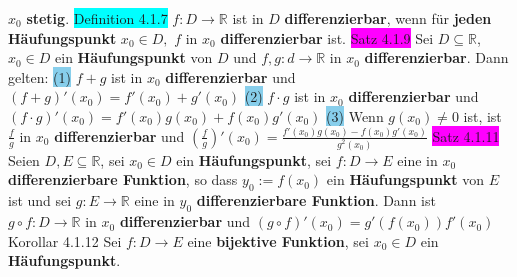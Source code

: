 \documentclass[landscape, 10pt]{article}
\newcommand{\R}{\mathbb{R}}
\begin{document}
\begin{multicols}{3}
                \textcolor{NavyBlue}{$x_0$} 
         \textbf{stetig}.
\colorbox{cyan}{Definition 4.1.7} \textcolor{NavyBlue}{$f:D\longrightarrow\R$} 
                ist in \textcolor{NavyBlue}{$D$} \textbf{differenzierbar}, 
                wenn für \textbf{jeden Häufungspunkt} $x_0\in D,$
                \textcolor{NavyBlue}{$f$} in \textcolor{NavyBlue}{$x_0$} 
         \textbf{differenzierbar} ist.
\colorbox{magenta}{Satz 4.1.9} Sei \textcolor{NavyBlue}{$D\subseteq\R$},\,
                \textcolor{NavyBlue}{$x_0\in D$} 
                ein \textbf{Häufungspunkt} von \textcolor{NavyBlue}{$D$} 
                und \textcolor{NavyBlue}{$f,g:d\longrightarrow\R$} in 
                \textcolor{NavyBlue}{$x_0$} \textbf{differenzierbar}. Dann gelten:
         \colorbox{SkyBlue}{(1)} \textcolor{NavyBlue}{$f+g$}
                 ist in \textcolor{NavyBlue}{$x_0$} \textbf{differenzierbar} und 
                 \textcolor{NavyBlue}{$(f+g)'(x_0)=f'(x_0)+g'(x_0)$} 
         \colorbox{SkyBlue}{(2)} \textcolor{NavyBlue}{$f\cdot g$} 
                ist in \textcolor{NavyBlue}{$x_0$} \textbf{differenzierbar} und 
                \textcolor{NavyBlue}{$(f\cdot g)'(x_0)=f'(x_0)g(x_0)+f(x_0)g'(x_0)$} 
         \colorbox{SkyBlue}{(3)} Wenn \textcolor{NavyBlue}{$g(x_0)\neq0$} ist, ist 
                \textcolor{NavyBlue}{$\frac{f}{g}$} in 
                \textcolor{NavyBlue}{$x_0$} \textbf{differenzierbar} und 
                \textcolor{NavyBlue}{
                $(\frac{f}{g})'(x_0)=\frac{f'(x_0)g(x_0)-f(x_0)g'(x_0)}{g^2(x_0)}$} 
\colorbox{magenta}{Satz 4.1.11} Seien \textcolor{NavyBlue}{$D,E\subseteq\R$}, 
                sei \textcolor{NavyBlue}{$x_0\in D$}
                ein \textbf{Häufungspunkt}, sei \textcolor{NavyBlue}{$f:D\longrightarrow E$}
                eine in \textcolor{NavyBlue}{$x_0$}
                \textbf{differenzierbare 
         Funktion}, so dass \textcolor{NavyBlue}{$y_0:=f(x_0)$} ein \textbf{Häufungspunkt} von 
                \textcolor{NavyBlue}{$E$} ist und sei 
                \textcolor{NavyBlue}{$g:E\longrightarrow\R$} eine in 
                \textcolor{NavyBlue}{$y_0$} 
                \textbf{differenzierbare 
         Funktion}. Dann ist 
                \textcolor{NavyBlue}{$g\circ f:D\longrightarrow\R$} in 
                \textcolor{NavyBlue}{$x_0$} \textbf{differenzierbar} und 
                \textcolor{NavyBlue}{$(g\circ f)'(x_0)=g'(f(x_0))f'(x_0)$}
\colorbox{BurntOrange}{Korollar 4.1.12} Sei \textcolor{NavyBlue}{$f:D\longrightarrow E$} eine 
                \textbf{bijektive Funktion}, sei 
                \textcolor{NavyBlue}{$x_0\in D$} ein \textbf{Häufungspunkt}. 

\end{multicols}
\end{document}
